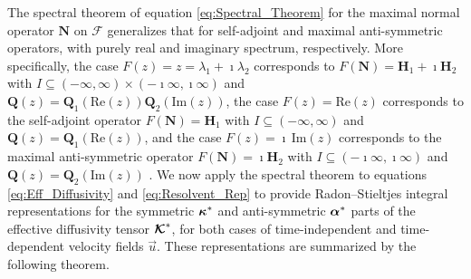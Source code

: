 \documentclass[11pt]{amsart}
\newcommand{\Hb}{\mathbf{H}}
\newcommand{\Qb}{\mathbf{Q}}
\newcommand{\Nb}{\mathbf{N}}
\newcommand\Kbc{\mbox{\boldmath${\mathcal{K}}$}}
\newcommand{\Fs}{\mathscr{F}}
\newcommand\balpha{\mbox{\boldmath${\alpha}$}}
\newcommand\bkappa{\mbox{\boldmath${\kappa}$}}
\begin{document}
 

The spectral theorem of equation \eqref{eq:Spectral_Theorem} for the
maximal normal operator $\Nb$ on $\Fs$ generalizes that for
self-adjoint and maximal anti-symmetric operators, with purely real
and imaginary spectrum, respectively. More specifically, the case
$F(z)=z=\lambda_1+\imath\lambda_2$ corresponds to $F(\Nb)=\Hb_1+\imath\Hb_2$ with
$I\subseteq(-\infty,\infty)\times(-\imath\infty,\imath\infty)$ and
$\Qb(z)=\Qb_1(\text{Re}(z))\Qb_2(\text{Im}(z))$, the case
$F(z)=\text{Re}(z)$ corresponds to the self-adjoint operator   
$F(\Nb)=\Hb_1$ with $I\subseteq(-\infty,\infty)$ and $\Qb(z)=\Qb_1(\text{Re}(z))$,
and the case $F(z)=\imath\,\text{Im}(z)$ corresponds to the maximal
anti-symmetric operator $F(\Nb)=\imath\Hb_2$ with $I\subseteq(-\imath\infty,\imath\infty)$ and
$\Qb(z)=\Qb_2(\text{Im}(z))$ \cite{Stone:64}. We now apply the
spectral theorem to equations \eqref{eq:Eff_Diffusivity} and
\eqref{eq:Resolvent_Rep} to provide Radon--Stieltjes integral
representations for the symmetric $\bkappa^*$ and anti-symmetric
$\balpha^*$ parts of the effective diffusivity tensor $\Kbc^*$, for
both cases of time-independent and time-dependent velocity fields
$\vec{u}$. These representations are summarized by the following
theorem.  
%
\end{document}
